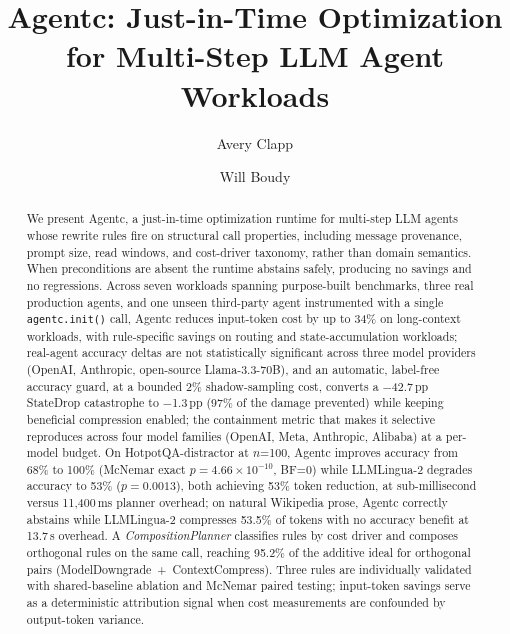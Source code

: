 \documentclass[sigconf,9pt]{acmart}
\begin{document}
\title{Agentc: Just-in-Time Optimization for Multi-Step LLM Agent Workloads}

\author{Avery Clapp}

\author{Will Boudy}

\begin{abstract}
We present Agentc, a just-in-time optimization runtime for multi-step LLM agents
whose rewrite rules fire on structural call properties, including message provenance,
prompt size, read windows, and cost-driver taxonomy, rather than domain semantics.
When preconditions are absent the runtime abstains safely, producing no savings and no
regressions. Across seven workloads spanning purpose-built benchmarks, three real
production agents, and one unseen third-party agent instrumented with a single
\texttt{agentc.init()} call, Agentc reduces input-token cost by up to 34\% on
long-context workloads, with rule-specific savings on routing and state-accumulation
workloads; real-agent accuracy deltas are not statistically significant across three
model providers (OpenAI, Anthropic, open-source Llama-3.3-70B), and an automatic,
label-free accuracy guard, at a bounded 2\% shadow-sampling cost, converts a $-$42.7\,pp
StateDrop catastrophe to $-$1.3\,pp (97\% of the damage prevented) while keeping beneficial
compression enabled; the containment metric that makes it selective reproduces across four
model families (OpenAI, Meta, Anthropic, Alibaba) at a per-model budget. On
HotpotQA-distractor at $n$=100, Agentc improves accuracy from 68\% to 100\% (McNemar
exact $p=4.66\times10^{-10}$, BF=0) while LLMLingua-2 degrades accuracy to 53\%
($p=0.0013$), both achieving 53\% token reduction, at sub-millisecond versus
11{,}400\,ms planner overhead; on natural Wikipedia prose, Agentc correctly abstains
while LLMLingua-2 compresses 53.5\% of tokens with no accuracy benefit at 13.7\,s
overhead. A \textit{CompositionPlanner} classifies rules by cost driver and composes
orthogonal rules on the same call, reaching 95.2\% of the additive ideal for
orthogonal pairs (ModelDowngrade~+~ContextCompress). Three rules are individually
validated with shared-baseline ablation and McNemar paired testing; input-token
savings serve as a deterministic attribution signal when cost measurements are
confounded by output-token variance.
\end{abstract}

\maketitle
\end{document}

